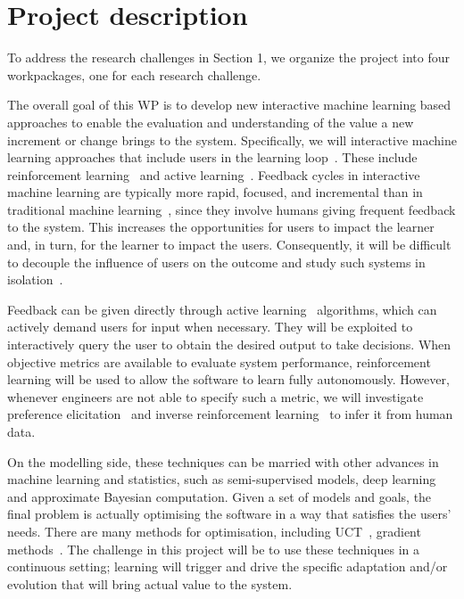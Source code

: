 \documentclass[12pt]{article}
\begin{document}
\vspace{-.5cm}


\section{Project description}
\vspace{-.4cm}


To address the research challenges in Section 1, we organize the project into four workpackages, one for each research challenge.

\vspace{.2cm}
  
\noindent The overall goal of this WP is to develop new interactive
machine learning based approaches to enable the evaluation and
understanding of the value a new increment or change brings to the
system.  Specifically, we will interactive machine learning approaches
that include users in the learning
loop~\cite{interactiveMachineLearning}.  These include reinforcement
learning~\cite{suba,BertsekasTsitsiklis:NDP} and active
learning~\cite{ActiveLearning}. Feedback cycles in interactive machine
learning are typically more rapid, focused, and incremental than in
traditional machine
learning~\cite{interactiveMachineLearningExperience}, since they
involve humans giving frequent feedback to the system.  This increases
the opportunities for users to impact the learner and, in turn, for
the learner to impact the users. Consequently, it will be difficult to
decouple the influence of users on the outcome and study such systems
in isolation~\cite{interactiveMachineLearningExperience}.


Feedback can be given directly through active
learning~\cite{ActiveLearning} algorithms, which can actively demand
users for input when necessary.  They will be exploited to
interactively query the user to obtain the desired output to take
decisions. When objective metrics are available to evaluate system
performance, reinforcement learning will be used to allow the software
to learn fully autonomously.  However, whenever engineers are not able
to specify such a metric, we will investigate preference
elicitation~\cite{rothkopf:peirl:ecml:2011} and inverse reinforcement
learning~\cite{uai:irl,Choi:NPBIRL:nips2012} to infer it from human
data. 

On the modelling side, these techniques can be married with other
advances in machine learning and statistics, such as semi-supervised
models, deep learning and approximate Bayesian computation. Given a
set of models and goals, the final problem is actually optimising the software in a way that satisfies the users' needs. There are many methods
for optimisation, including UCT~\cite{ECML:Kocsis+Szepesvari:2006},
gradient
methods~\cite{dimitrakakis:gbrl,ghavamzadeh:bpga,knowgrad}. The
challenge in this project will be to use these techniques in a
continuous setting; learning will trigger and drive the specific
adaptation and/or evolution that will bring actual value to the
system.
\end{document}
